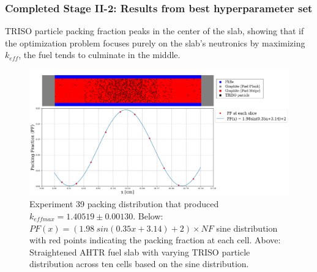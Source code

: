 \begin{frame}
    \frametitle{Completed Stage II-2: Results from best hyperparameter set}
    TRISO particle packing fraction peaks in the center 
    of the slab, showing that if the optimization problem focuses purely on the 
    slab's neutronics by maximizing $k_{eff}$, the fuel tends to culminate in the 
    middle. 
    \vspace{-0.2cm}
    \begin{figure}[]
        \centering
        \includegraphics[width=0.7\linewidth]{../docs/figures/triso_distribution_sine_39.png} 
        \vspace{-0.2cm}
        \caption{Experiment 39 packing distribution that produced $k_{eff max} = 1.40519 \pm 0.00130$. 
        Below: $PF(x) = (1.98\ sin(0.35x+3.14)+2)  \times NF$ sine distribution with 
        red points indicating the packing fraction at each cell. 
        Above: Straightened AHTR fuel slab with varying TRISO particle 
        distribution across ten cells based on the sine distribution. }
        \label{fig:triso_distribution_sine_39}
    \end{figure}
\end{frame}